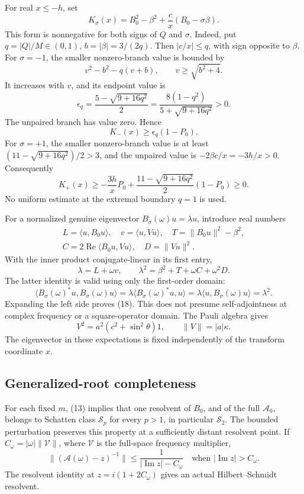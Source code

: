 \documentclass[
  10pt,
  a4paper,
]{article}
\begin{document}
For real \(x\le-h\), set \[
 K_\sigma(x)=B_0^2-\beta^2+\frac c x(B_0-\sigma\beta).
 \tag{15}
\] This form is nonnegative for both signs of \(Q\) and \(\sigma\).
Indeed, put \(q=|Q|/M\in(0,1)\), \(b=|\beta|=3/(2q)\). Then
\(|c/x|\le q\), with sign opposite to \(\beta\). For \(\sigma=-1\), the
smaller nonzero-branch value is bounded by \[
 v^2-b^2-q(v+b),\qquad v\ge\sqrt{b^2+4}.
\] It increases with \(v\), and its endpoint value is \[
 \epsilon_q=\frac{5-\sqrt{9+16q^2}}2
 =\frac{8(1-q^2)}{5+\sqrt{9+16q^2}}>0.
\] The unpaired branch has value zero. Hence \[
 K_-(x)\ge\epsilon_q(1-P_0).
 \tag{16}
\] For \(\sigma=+1\), the smaller nonzero-branch value is at least
\((11-\sqrt{9+16q^2})/2>3\), and the unpaired value is
\(-2\beta c/x=-3h/x>0\). Consequently \[
 K_+(x)\ge-\frac{3h}{x}P_0+
 \frac{11-\sqrt{9+16q^2}}2(1-P_0)\ge0.
 \tag{17}
\] No uniform estimate at the extremal boundary \(q=1\) is used.

For a normalized genuine eigenvector \(B_\sigma(\omega)u=\lambda u\),
introduce real numbers \[
\begin{gathered}
 L=\langle u,B_0u\rangle,\quad v=\langle u,Vu\rangle,\quad
 T=\|B_0u\|^2-\beta^2,\\
 C=2\operatorname{Re}\langle B_0u,Vu\rangle,\quad D=\|Vu\|^2.
\end{gathered}
\] With the inner product conjugate-linear in its first entry, \[
 \lambda=L+\omega v,\qquad
 \lambda^2=\beta^2+T+\omega C+\omega^2D .
 \tag{18}
\] The latter identity is valid using only the first-order domain: \[
 \langle B_\sigma(\omega)^*u,B_\sigma(\omega)u\rangle
 =\lambda\langle B_\sigma(\omega)^*u,u\rangle
 =\lambda\langle u,B_\sigma(\omega)u\rangle=\lambda^2.
\] Expanding the left side proves (18). This does not presume
self-adjointness at complex frequency or a square-operator domain. The
Pauli algebra gives \[
 V^2=a^2(c^2+\sin^2\theta)1,\qquad \|V\|=|a|\kappa.
 \tag{19}
\] The eigenvector in these expectations is fixed independently of the
transform coordinate \(x\).

\subsection{Generalized-root
completeness}\label{generalized-root-completeness}

For each fixed \(m\), (13) implies that one resolvent of \(B_0\), and of
the full \(\mathcal A_0\), belongs to Schatten class \(\mathcal S_p\)
for every \(p>1\), in particular \(\mathcal S_2\). The bounded
perturbation preserves this property at a sufficiently distant resolvent
point. If \(C_\omega=|\omega|\|\mathcal V\|\), where \(\mathcal V\) is
the full-space frequency multiplier, \[
 \|(\mathcal A(\omega)-z)^{-1}\|
 \le\frac1{|\operatorname{Im}z|-C_\omega}
 \quad\text{when }|\operatorname{Im}z|>C_\omega .
 \tag{20}
\] The resolvent identity at \(z=i(1+2C_\omega)\) gives an actual
Hilbert--Schmidt resolvent.
\end{document}
